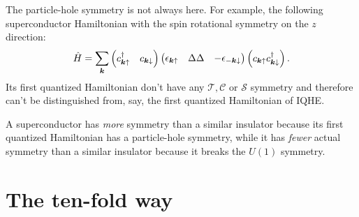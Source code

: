 \documentclass[hyperref, a4paper]{article}
\def\\{}%
\begin{document}
The particle-hole symmetry is not always here. For example, the following superconductor Hamiltonian with the spin rotational symmetry on the $z$ direction:
\begin{equation}
    \hat{H} = \sum_{\vb*{k}} \pmqty{c^\dagger_{\vb*{k} \uparrow} & c_{\vb*{k} \downarrow}} \pmqty{\epsilon_{\vb*{k} \uparrow} & \Delta \\ \Delta & - \epsilon_{- \vb*{k} \downarrow}} \pmqty{c_{\vb*{k} \uparrow} \\ c^\dagger_{\vb*{k} \downarrow}}.
    \label{eq:no-particle-hole-sc-example}
\end{equation}
Its first quantized Hamiltonian don't have any $\mathcal{T}, \mathcal{C}$ or $\mathcal{S}$ symmetry and therefore 
can't be distinguished from, say, the first quantized Hamiltonian of IQHE. 

A superconductor has \emph{more} symmetry than a similar insulator 
because its first quantized Hamiltonian has a particle-hole symmetry, while it has \emph{fewer} actual symmetry than a similar 
insulator because it breaks the $U(1)$ symmetry. 

\section{The ten-fold way}
\end{document}
